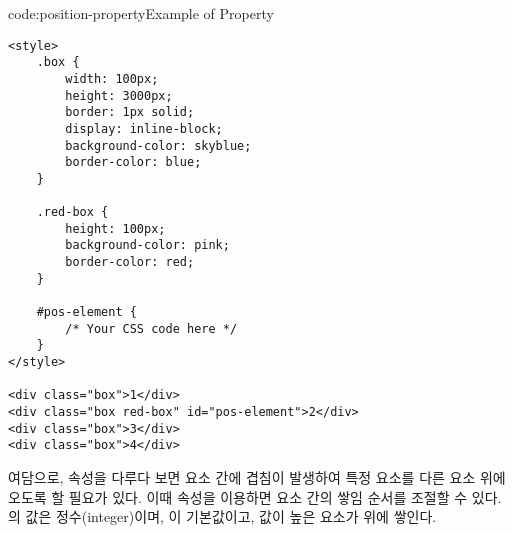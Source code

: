 \begin{codeenv}{code:position-property}{Example of  Property}\begin{verbatim}
<style>
    .box {
        width: 100px;
        height: 3000px;
        border: 1px solid;
        display: inline-block;
        background-color: skyblue;
        border-color: blue;
    }

    .red-box {
        height: 100px;
        background-color: pink;
        border-color: red;
    }

    #pos-element {
        /* Your CSS code here */
    }
</style>

<div class="box">1</div>
<div class="box red-box" id="pos-element">2</div>
<div class="box">3</div>
<div class="box">4</div>
\end{verbatim}
\end{codeenv}

여담으로,  속성을 다루다 보면 요소 간에 겹침이 발생하여 특정 요소를 다른 요소 위에 오도록 할 필요가 있다. 이때  속성을 이용하면 요소 간의 쌓임 순서를 조절할 수 있다. 의 값은 정수(integer)이며, 이 기본값이고, 값이 높은 요소가 위에 쌓인다.
